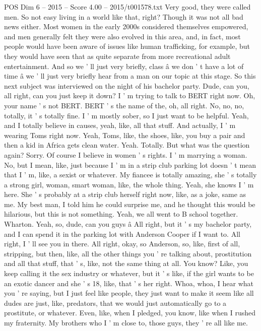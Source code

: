 \begin{textsample}{POS Dim 6 – 2015 – Score 4.00 – 2015/t001578.txt}
Very good, they were called men.
So not easy living in a world like that, right?
Though it was not all bad news either.
Most women in the early 2000s considered themselves empowered, and men generally felt they were also evolved in this area, and, in fact, most people would have been aware of issues like human trafficking, for example, but they would have seen that as quite separate from more recreational adult entertainment.
And so we ' ll just very briefly, class â we don ' t have a lot of time â we ' ll just very briefly hear from a man on our topic at this stage.
So this next subject was interviewed on the night of his bachelor party.
Dude, can you, all right, can you just keep it down?
I ' m trying to talk to BERT right now.
Oh, your name ' s not BERT.
BERT ' s the name of the, oh, all right.
No, no, no, totally, it ' s totally fine.
I ' m mostly sober, so I just want to be helpful.
Yeah, and I totally believe in causes, yeah, like, all that stuff.
And actually, I ' m wearing Toms right now.
Yeah, Toms, like, the shoes, like, you buy a pair and then a kid in Africa gets clean water.
Yeah.
Totally.
But what was the question again?
Sorry.
Of course I believe in women ' s rights.
I ' m marrying a woman.
No, but I mean, like, just because I ' m in a strip club parking lot doesn ' t mean that I ' m, like, a sexist or whatever.
My fiancee is totally amazing, she ' s totally a strong girl, woman, smart woman, like, the whole thing.
Yeah, she knows I ' m here.
She ' s probably at a strip club herself right now, like, as a joke, same as me.
My best man, I told him he could surprise me, and he thought this would be hilarious, but this is not something.
Yeah, we all went to B school together.
Wharton.
Yeah, so, dude, can you guys â All right, but it ' s my bachelor party, and I can spend it in the parking lot with Anderson Cooper if I want to.
All right, I ' ll see you in there.
All right, okay, so Anderson, so, like, first of all, stripping, but then, like, all the other things you ' re talking about, prostitution and all that stuff, that ' s, like, not the same thing at all.
You know?
Like, you keep calling it the sex industry or whatever, but it ' s like, if the girl wants to be an exotic dancer and she ' s 18, like, that ' s her right.
Whoa, whoa, I hear what you ' re saying, but I just feel like people, they just want to make it seem like all dudes are just, like, predators, that we would just automatically go to a prostitute, or whatever.
Even, like, when I pledged, you know, like when I rushed my fraternity.
My brothers who I ' m close to, those guys, they ' re all like me.

\end{textsample}
